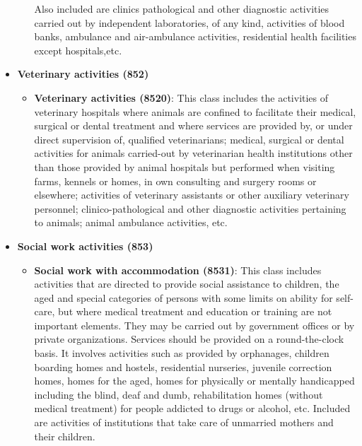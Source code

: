 \documentclass[a4paper,12pt]{article}
\begin{document}
\begin{itemize}
\begin{itemize}
Also included are clinics pathological and other diagnostic activities carried out by independent laboratories, of any kind, activities of blood banks, ambulance and air-ambulance activities, residential health facilities except hospitals,etc.
\end{itemize}
\item \textbf{Veterinary activities (852)}
\begin{itemize}
\item \textbf{Veterinary activities (8520)}: This class includes the activities of veterinary hospitals where animals are confined to facilitate their medical, surgical or dental treatment and where services are provided by, or under direct supervision of, qualified veterinarians; medical, surgical or dental activities for animals carried-out by veterinarian health institutions other than those provided by animal hospitals but performed when visiting farms, kennels or homes, in own consulting and surgery rooms or elsewhere; activities of veterinary assistants or other auxiliary veterinary personnel; clinico-pathological and other diagnostic activities pertaining to animals; animal ambulance activities, etc.
\end{itemize}
\item \textbf{Social work activities (853)}
\begin{itemize}
\item \textbf{Social work with accommodation (8531)}: This class includes activities that are directed to provide social assistance to children, the aged and special categories of persons with some limits on ability for self-care, but where medical treatment and education or training are not important elements. They may be carried out by government offices or by private organizations. Services should be provided on a round-the-clock basis. It involves activities such as provided by orphanages, children boarding homes and hostels, residential nurseries, juvenile correction homes, homes for the aged, homes for physically or mentally handicapped including the blind, deaf and dumb, rehabilitation homes (without medical treatment) for people addicted to drugs or alcohol, etc. Included are activities of institutions that take care of unmarried mothers and their children.

\end{itemize}
\end{itemize}
\end{document}
